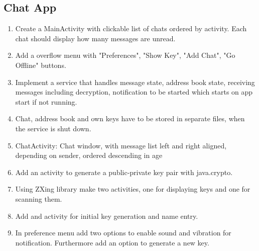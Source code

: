 \subsection{Chat App}
	\begin{enumerate}
		\item Create a MainActivity with clickable list of chats ordered by activity. Each chat should display how many messages are unread.
		\item Add a overflow menu with "Preferences", "Show Key", "Add Chat", "Go Offline" buttons.
		\item Implement a service that handles message state, address book state, receiving messages including decryption, notification to be started which starts on app start if not running.
		\item Chat, address book and own keys have to be stored in separate files, when the service is shut down.
		\item ChatActivity: Chat window, with message list left and right aligned, depending on sender, ordered descending in age
		\item Add an activity to generate a public-private key pair with java.crypto.
		\item Using ZXing library make two activities, one for displaying keys and one for scanning them.
		\item Add and activity for initial key generation and name entry.
		\item In preference menu add two options to enable sound and vibration for notification. Furthermore add an option to generate a new key.
	\end{enumerate}
			